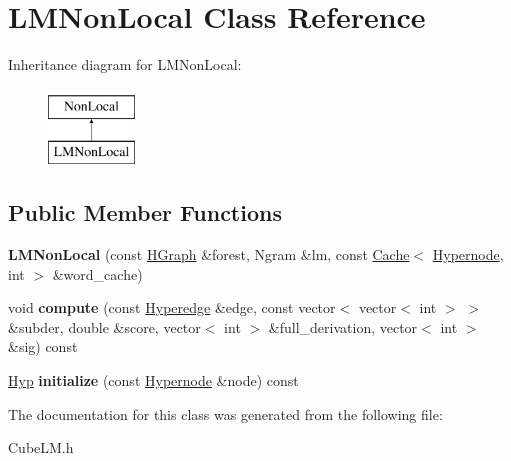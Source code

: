 \hypertarget{classLMNonLocal}{
\section{LMNonLocal Class Reference}
\label{classLMNonLocal}
}
Inheritance diagram for LMNonLocal:\begin{figure}[H]
\begin{center}
\leavevmode
\includegraphics[height=2cm]{classLMNonLocal}
\end{center}
\end{figure}
\subsection*{Public Member Functions}
\begin{DoxyCompactItemize}
\item 
\hypertarget{classLMNonLocal_a7a6000f6118f1c8df727fac29c849b58}{
{\bfseries LMNonLocal} (const \hyperlink{classScarab_1_1HG_1_1HGraph}{HGraph} \&forest, Ngram \&lm, const \hyperlink{classCache}{Cache}$<$ \hyperlink{classScarab_1_1HG_1_1Hypernode}{Hypernode}, int $>$ \&word\_\-cache)}
\label{classLMNonLocal_a7a6000f6118f1c8df727fac29c849b58}

\item 
\hypertarget{classLMNonLocal_a2d14ca694dc6d49ce6e2b80622aafd51}{
void {\bfseries compute} (const \hyperlink{classScarab_1_1HG_1_1Hyperedge}{Hyperedge} \&edge, const vector$<$ vector$<$ int $>$ $>$ \&subder, double \&score, vector$<$ int $>$ \&full\_\-derivation, vector$<$ int $>$ \&sig) const }
\label{classLMNonLocal_a2d14ca694dc6d49ce6e2b80622aafd51}

\item 
\hypertarget{classLMNonLocal_a93334d873bfe91d5357cbec933ec3ae9}{
\hyperlink{structHyp}{Hyp} {\bfseries initialize} (const \hyperlink{classScarab_1_1HG_1_1Hypernode}{Hypernode} \&node) const }
\label{classLMNonLocal_a93334d873bfe91d5357cbec933ec3ae9}

\end{DoxyCompactItemize}


The documentation for this class was generated from the following file:\begin{DoxyCompactItemize}
\item 
CubeLM.h\end{DoxyCompactItemize}
